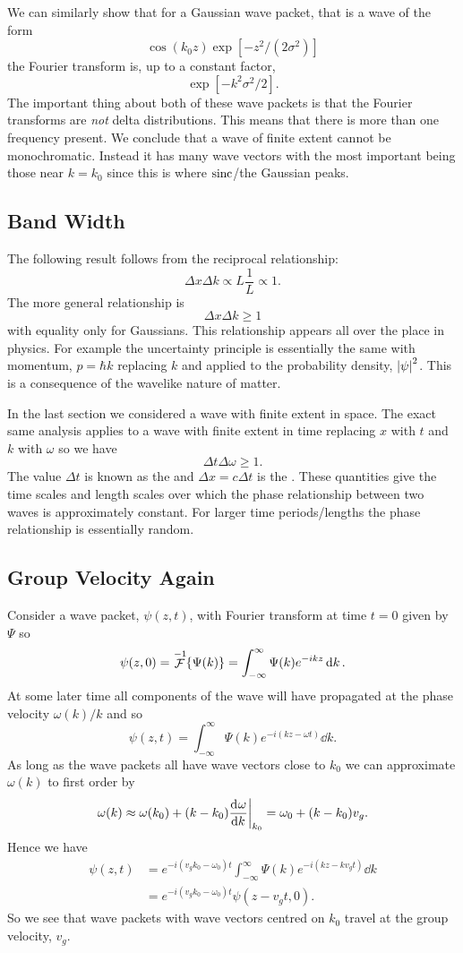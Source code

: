     We can similarly show that for a Gaussian wave packet, that is a wave of the form
    \[\cos(k_0z) \exp[-z^2/(2\sigma^2)]\]
    the Fourier transform is, up to a constant factor,
    \[\exp[-k^2\sigma^2/2].\]
    The important thing about both of these wave packets is that the Fourier transforms are \emph{not} delta distributions.
    This means that there is more than one frequency present.
    We conclude that a wave of finite extent cannot be monochromatic.
    Instead it has many wave vectors with the most important being those near \(k = k_0\) since this is where \(\operatorname{sinc}\)/the Gaussian peaks.
    
    \subsection{Band Width}
    The following result follows from the reciprocal relationship:
    \[\Delta x\Delta k \propto L \frac{1}{L} \propto 1.\]
    The more general relationship is
    \[\Delta x\Delta k \ge 1\]
    with equality only for Gaussians.
    This relationship appears all over the place in physics.
    For example the uncertainty principle is essentially the same with momentum, \(p = \hbar k\) replacing \(k\) and applied to the probability density, \(\abs{\psi}^2\).
    This is a consequence of the wavelike nature of matter.
    
    In the last section we considered a wave with finite extent in space.
    The exact same analysis applies to a wave with finite extent in time replacing \(x\) with \(t\) and \(k\) with \(\omega\) so we have
    \[\Delta t\Delta\omega \ge 1.\]
    The value \(\Delta t\) is known as the  and \(\Delta x = c\Delta t\) is the .
    These quantities give the time scales and length scales over which the phase relationship between two waves is approximately constant.
    For larger time periods/lengths the phase relationship is essentially random.
    
    \subsection{Group Velocity Again}
    Consider a wave packet, \(\psi(z, t)\), with Fourier transform at time \(t = 0\) given by \(\Psi\) so
    \[\psi(z, 0) = \mathop{\mathcal{F}}^{-1}\{\Psi(k)\} = \int_{-\infty}^{\infty} \Psi(k)e^{-ikz} \dd{k}.\]
    At some later time all components of the wave will have propagated at the phase velocity \(\omega(k)/k\) and so
    \[\psi(z, t) = \int_{-\infty}^{\infty} \Psi(k)e^{-i(kz - \omega t)} \dd{k}.\]
    As long as the wave packets all have wave vectors close to \(k_0\) we can approximate \(\omega(k)\) to first order by
    \[\omega(k) \approx \omega(k_0) + (k - k_0)\dv[]{\omega}{k}\biggr|_{k_0} = \omega_0 + (k - k_0)v_g.\]
    Hence we have
    \begin{align*}
        \psi(z, t) &= e^{-i(v_gk_0 - \omega_0)t} \int_{-\infty}^{\infty} \Psi(k)e^{-i(kz - kv_g t)}\dd{k}\\
        &= e^{-i(v_gk_0 - \omega_0)t} \psi(z - v_gt, 0).
    \end{align*}
    So we see that wave packets with wave vectors centred on \(k_0\) travel at the group velocity, \(v_g\).
    